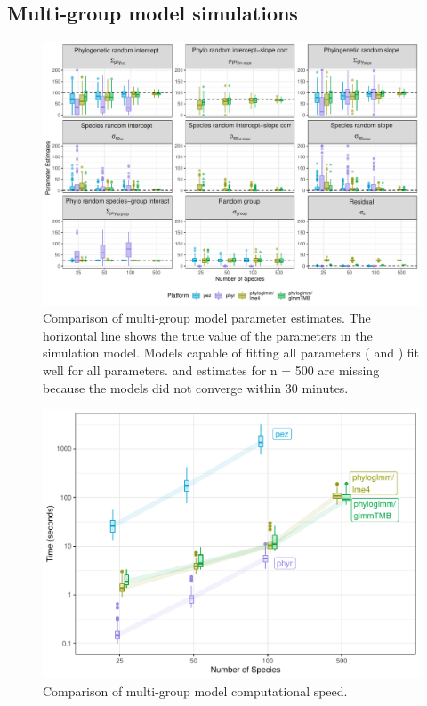 \documentclass[12pt]{article}
\begin{document}
\subsection*{Multi-group model simulations}

\begin{center}
\begin{figure}[H]
  \includegraphics[scale=0.7]{./figure/msplot.pdf}
  \caption{Comparison of multi-group model parameter estimates. The horizontal line shows the true value of the parameters in the simulation model. Models capable of fitting all parameters (\pkg{\plmefour} and \pkg{\pgTMB}) fit well for all parameters.  and  estimates for n = 500 are missing because the models did not converge within 30 minutes.
  }
  \label{msplot}
\end{figure}
\end{center}
\begin{center}
\begin{figure}[H]
  \includegraphics[scale=0.7]{./figure/mstime.pdf}
  \caption{Comparison of multi-group model computational speed.}
  \label{msplot_time}
\end{figure}
\end{center}
\end{document}
